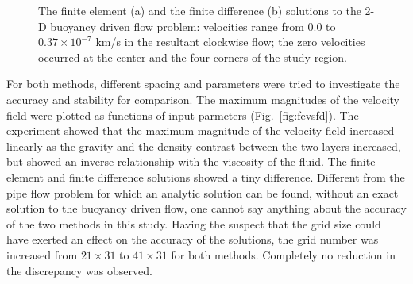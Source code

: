 \documentclass[11pt]{article}
\numberwithin{figure}{section}  %
\numberwithin{equation}{section}  %
\begin{document}
\begin{multicols}{2}
\begin{figure}[!htb]
	\centering
	\caption{The finite element (a) and the finite difference (b) solutions to the 2-D buoyancy driven flow problem: velocities range from $0.0$ to $0.37\times10^{-7}$ km/s in the resultant clockwise flow; the zero velocities occurred at the center and the four corners of the study region.}
	\label{fig:solutions}
\end{figure}

For both methods, different spacing and parameters were tried to investigate the accuracy and stability for comparison. The maximum magnitudes of the velocity field were plotted as functions of input parmeters (Fig.\ \ref{fig:fevsfd}). The experiment showed that the maximum magnitude of the velocity field increased linearly as the gravity and the density contrast between the two layers increased, but showed an inverse relationship with the viscosity of the fluid. The finite element and finite difference solutions showed a tiny difference. Different from the pipe flow problem for which an analytic solution can be found, without an exact solution to the buoyancy driven flow, one cannot say anything about the accuracy of the two methods in this study. Having the suspect that the grid size could have exerted an effect on the accuracy of the solutions, the grid number was increased from $21\times31$ to $41\times31$ for both methods. Completely no reduction in the discrepancy was observed.


\end{multicols}
\end{document}
